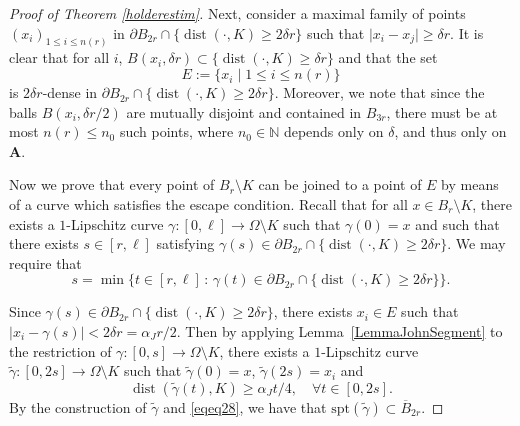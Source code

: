 \documentclass[12pt]{article}
\theoremstyle{definition}
\theoremstyle{remark}
\numberwithin{equation}{section}
\DeclareMathOperator{\dist}{dist}
\newcommand{\dd}{\partial}
\newcommand{\abs}[1]{\lvert #1 \rvert}
\newcommand{\N}{\mathbb{N}}
\newcommand{\A}{\mathbf{A}}
\begin{document}
\begin{proof}[Proof of Theorem \ref{holderestim}]
    Next, consider a maximal family of points $(x_i)_{1 \leq i \leq  n(r)}$ in $\dd B_{2r}\cap \{\dist(\cdot,K)\geq 2\delta r\}$ such that $\abs{x_i - x_j} \geq \delta r$.
    It is clear that for all $i$, $B(x_i,\delta r) \subset \{\dist(\cdot,K) \geq \delta r\}$ and that the set \[E := \{x_i \mid 1 \leq i \leq n(r)\}\] is $2\delta r$-dense in $\dd B_{2r} \cap \{\dist(\cdot,K) \geq 2 \delta r\}$.
    Moreover, we note that since the balls $B(x_i,\delta r/2)$ are mutually disjoint and contained in $B_{3r}$, there must be at most $n(r) \leq n_0$ such points, where $n_0 \in \N$ depends only on $\delta$, and thus only on $\A$. 


    Now we prove that every point of $B_r\setminus K$ can be joined to a point of $E$ by means of a curve which satisfies the escape condition. Recall that for all $x \in B_r \setminus K$, there exists a $1$-Lipschitz curve $\gamma \colon [0,\ell] \longrightarrow \Omega \setminus K$ such that $\gamma(0) = x$ and such that there exists $s \in [r,\ell]$ satisfying $\gamma(s) \in \dd B_{2r} \cap \{\dist(\cdot,K)\geq 2\delta r\}$.  We may require that 
    \begin{equation}
        \label{eqeq28}
        s=\min \big\{t\in[r,\ell]\,:\,\gamma(t)\in\dd B_{2r}\cap \{\dist(\cdot,K)\geq 2\delta r\}\big\}.
    \end{equation}



    Since $\gamma(s) \in \dd B_{2r} \cap \{\dist(\cdot,K) \geq 2 \delta r\}$, there exists $x_i \in E$ such that $\abs{x_i - \gamma(s)} < 2\delta r = \alpha_J r/2$.
    Then by applying Lemma~\ref{LemmaJohnSegment} to the restriction of $\gamma : [0,s] \longrightarrow \Omega \setminus K$, there exists a $1$-Lipschitz curve $\tilde{\gamma} : [0,2s] \longrightarrow \Omega \setminus K$ such that $\tilde{\gamma}(0) = x$, $\tilde{\gamma}(2s) = x_i$ and
    \begin{equation}\label{eqeq14}
        \dist(\tilde{\gamma}(t),K)\geq \alpha_J t/4, \quad\forall t\in[0,2s].
    \end{equation}
By the construction of $\tilde{\gamma}$ and \eqref{eqeq28}, we have that $\mathrm{spt}(\tilde{\gamma})\subset \overline{B}_{2r}$. 




\end{proof}
\end{document}
